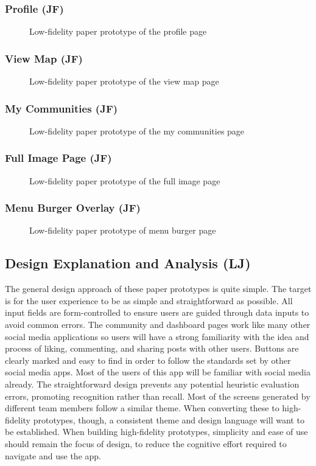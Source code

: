 \documentclass[a4paper,12pt]{article}
\newcommand{\includescalefigurerotate}[6]{
\begin{figure}[H]
\centering
\rotatebox[origin=c]{#6}{\texttt{[image: \#5]}}
\captionsetup{width=.8\linewidth} 
\caption[#2]{#3}
\label{#1}
\end{figure}
}
\begin{document}
\subsubsection{Profile (JF)}
\includescalefigurerotate{fig:profile}{Profile Page Paper Prototype}{Low-fidelity paper prototype of the profile page}{0.8}{"prototypes/Profile Page.jpg"}{180}
\subsubsection{View Map (JF)}
\includescalefigurerotate{fig:map}{View Map Page Paper Prototype}{Low-fidelity paper prototype of the view map page}{0.8}{"prototypes/View Map.jpg"}{0}
\subsubsection{My Communities (JF)}
\includescalefigurerotate{fig:my_comm}{My Communities Page Paper Prototype}{Low-fidelity paper prototype of the my communities page}{.8}{"prototypes/My Communities.jpg"}{180}
\subsubsection{Full Image Page (JF)}
\includescalefigurerotate{fig:image_full}{Full Image Page Paper Prototype}{Low-fidelity paper prototype of the full image page}{1}{"prototypes/Full Image.jpg"}{270}
\subsubsection{Menu Burger Overlay (JF)}
\includescalefigurerotate{fig:menu_burger}{Menu Burger Paper Prototype}{Low-fidelity paper prototype of menu burger page}{1}{"prototypes/Menu Overlays.jpg"}{270}

\subsection{Design Explanation and Analysis (LJ) }
The general design approach of these paper prototypes is quite simple. The target is for the user experience to be as simple and straightforward as possible. All input fields are form-controlled to ensure users are guided through data inputs to avoid common errors. The community and dashboard pages work like many other social media applications so users will have a strong familiarity with the idea and process of liking, commenting, and sharing posts with other users. Buttons are clearly marked and easy to find in order to follow the standards set by other social media apps. Most of the users of this app will be familiar with social media already. The straightforward design prevents any potential heuristic evaluation errors, promoting recognition rather than recall. Most of the screens generated by different team members follow a similar theme. When converting these to high-fidelity prototypes, though, a consistent theme and design language will want to be established. When building high-fidelity prototypes, simplicity and ease of use should remain the focus of design, to reduce the cognitive effort required to navigate and use the app.
\end{document}
